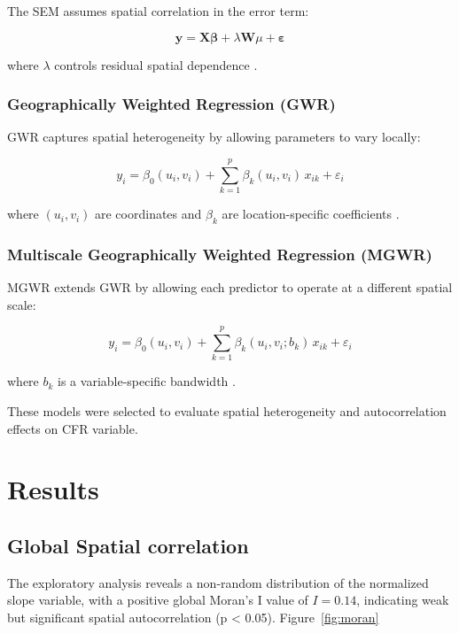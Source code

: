 \documentclass[a4paper,fleqn]{cas-sc}
\begin{document}
The SEM assumes spatial correlation in the error term:

\[
\mathbf{y} = \mathbf{X}\boldsymbol{\beta} + \lambda\mathbf{W}\mu + \boldsymbol{\varepsilon}
\]

where \( \lambda \) controls residual spatial dependence \citep{Aristizabal2024}.

\vspace{0.5em}
\subsubsection{Geographically Weighted Regression (GWR)}

GWR captures spatial heterogeneity by allowing parameters to vary locally:

\[
y_i = \beta_0(u_i, v_i) + \sum_{k=1}^{p} \beta_k(u_i, v_i)\, x_{ik} + \varepsilon_i
\]

where \( (u_i, v_i) \) are coordinates and \( \beta_k \) are location-specific coefficients \citep{Aristizabal2024}.

\vspace{0.5em}
\subsubsection{Multiscale Geographically Weighted Regression (MGWR)}

MGWR extends GWR by allowing each predictor to operate at a different spatial scale:

\[
y_i = \beta_0(u_i, v_i) + \sum_{k=1}^{p} \beta_k(u_i, v_i; b_k)\, x_{ik} + \varepsilon_i
\]

where \( b_k \) is a variable-specific bandwidth \citep{Aristizabal2024}.

These models were selected to evaluate spatial heterogeneity and autocorrelation effects on CFR variable.

\section{Results}

\subsection{Global Spatial correlation}

The exploratory analysis reveals a non-random distribution of the normalized slope variable, with a positive global Moran's I value of $I = 0.14$, indicating weak but significant spatial autocorrelation (p < 0.05). Figure~\ref{fig:moran}
\end{document}
